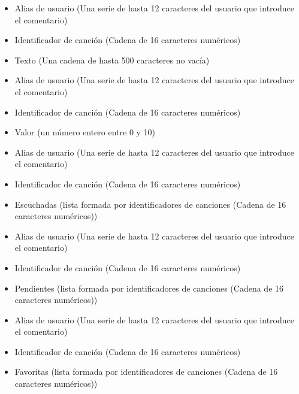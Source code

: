
\begin{itemize}
\item Alias de usuario (Una serie de hasta 12 caracteres del usuario que introduce el comentario)
\item Identificador de canción (Cadena de 16 caracteres numéricos)
\item Texto (Una cadena de hasta 500 caracteres no vacía)
\end{itemize}

\begin{itemize}
\item Alias de usuario (Una serie de hasta 12 caracteres del usuario que introduce el comentario)
\item Identificador de canción (Cadena de 16 caracteres numéricos)
\item Valor (un número entero entre 0 y 10)
\end{itemize}

\begin{itemize}
\item Alias de usuario (Una serie de hasta 12 caracteres del usuario que introduce el comentario)
\item Identificador de canción (Cadena de 16 caracteres numéricos)
\item Escuchadas (lista formada por identificadores de canciones (Cadena de 16 caracteres numéricos))
\end{itemize}

\begin{itemize}
\item Alias de usuario (Una serie de hasta 12 caracteres del usuario que introduce el comentario)
\item Identificador de canción (Cadena de 16 caracteres numéricos)
\item Pendientes (lista formada por identificadores de canciones (Cadena de 16 caracteres numéricos))
\end{itemize}

\begin{itemize}
  \item Alias de usuario (Una serie de hasta 12 caracteres del usuario que introduce el comentario)
  \item Identificador de canción (Cadena de 16 caracteres numéricos)
  \item Favoritas (lista formada por identificadores de canciones (Cadena de 16 caracteres numéricos))
\end{itemize}

